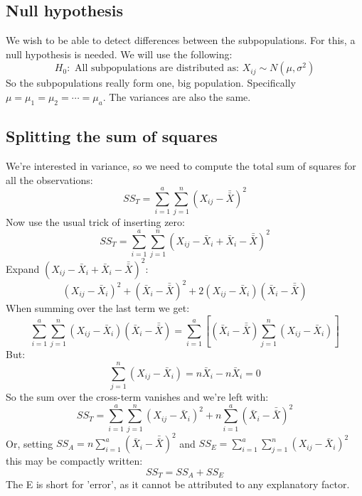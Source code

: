 \documentclass[12pt, a4paper]{article}
\newcommand*{\doublebar}[1]{\bar{\bar{#1}}}
\begin{document}
\subsection{Null hypothesis}
We wish to be able to detect differences between the subpopulations. For this, a null hypothesis is needed. We will use the following:
\begin{equation}
\label{H0}
H_0:\textrm{ All subpopulations are distributed as: }X_{ij}\sim N(\mu,\sigma^2)
\end{equation}
So the subpopulations really form one, big population. Specifically $\mu=\mu_1=\mu_2=\cdots=\mu_a$. The variances are also the same.

\subsection{Splitting the sum of squares}
We're interested in variance, so we need to compute the total sum of squares for all the observations:
\begin{equation}
SS_T=\sum_{i=1}^a\sum_{j=1}^n\left(X_{ij}-\doublebar{X}\right)^2
\end{equation}
Now use the usual trick of inserting zero:
\begin{equation}
SS_T=\sum_{i=1}^a\sum_{j=1}^n\left(X_{ij}-\bar{X}_i+\bar{X}_i-\doublebar{X}\right)^2
\end{equation}
Expand $\left(X_{ij}-\bar{X}_i+\bar{X}_i-\doublebar{X}\right)^2$:
\begin{equation}
\left(X_{ij}-\bar{X}_i\right)^2+\left(\bar{X}_i-\doublebar{X}\right)^2+2\left(X_{ij}-\bar{X}_i\right)\left(\bar{X}_i-\doublebar{X}\right)
\end{equation}
When summing over the last term we get:
\begin{equation}
\sum_{i=1}^a\sum_{j=1}^n\left(X_{ij}-\bar{X}_i\right)\left(\bar{X}_i-\doublebar{X}\right)=\sum_{i=1}^a\left[\left(\bar{X}_i-\doublebar{X}\right)\sum_{j=1}^n\left(X_{ij}-\bar{X}_i\right)\right]
\end{equation}
But:
\begin{equation}
\sum_{j=1}^n\left(X_{ij}-\bar{X}_i\right)=n\bar{X}_i-n\bar{X}_i=0
\end{equation}
So the sum over the cross-term vanishes and we're left with:
\begin{equation}
SS_T=\sum_{i=1}^a\sum_{j=1}^n\left(X_{ij}-\bar{X}_i\right)^2+n\sum_{i=1}^a\left(\bar{X}_i-\doublebar{X}\right)^2
\end{equation}
Or, setting $SS_A=n\sum_{i=1}^a\left(\bar{X}_i-\doublebar{X}\right)^2$ and $SS_E=\sum_{i=1}^a\sum_{j=1}^n\left(X_{ij}-\bar{X}_i\right)^2$ this may be compactly written:
\begin{equation}
\label{totalsum}
SS_T=SS_A+SS_E
\end{equation}
The E is short for 'error', as it cannot be attributed to any explanatory factor.
\end{document}
